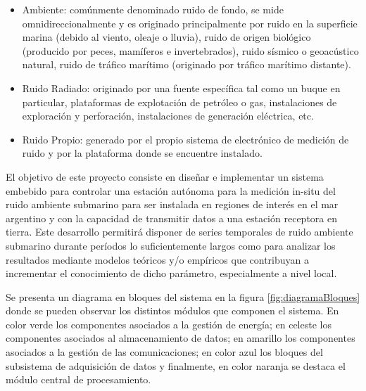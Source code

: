 \begin{itemize}
	\item Ambiente: comúnmente denominado ruido de fondo, se mide omnidireccionalmente y es originado principalmente por ruido en la superficie marina (debido al viento, oleaje o lluvia), ruido de origen biológico (producido por peces, mamíferos e invertebrados), ruido sísmico o geoacústico natural, ruido de tráfico marítimo (originado por tráfico marítimo distante).
	\item Ruido Radiado: originado por una fuente específica tal como un buque en particular, plataformas de explotación de petróleo o gas, instalaciones de exploración y perforación, instalaciones de generación eléctrica, etc.
	\item Ruido Propio: generado por el propio sistema de electrónico de medición de ruido y por la plataforma donde se encuentre instalado.
\end{itemize} 

El objetivo de este proyecto consiste en diseñar e implementar un sistema embebido para controlar una estación autónoma para la medición in-situ del ruido ambiente submarino para ser instalada en regiones de interés en el mar argentino y con la capacidad de transmitir datos a una estación receptora en tierra. Este desarrollo permitirá disponer de series temporales de ruido ambiente submarino durante períodos lo suficientemente largos como para analizar los resultados mediante modelos teóricos y/o empíricos que contribuyan a incrementar el conocimiento de dicho parámetro, especialmente a nivel local.

Se presenta un diagrama en bloques del sistema en la figura \ref{fig:diagramaBloques} donde se pueden observar los distintos módulos que componen el sistema.  En color verde los componentes asociados a la gestión de energía; en celeste los componentes asociados al almacenamiento de datos; en amarillo los componentes asociados a la gestión de las comunicaciones; en color azul los bloques del subsistema de adquisición de datos y finalmente, en color naranja se destaca el módulo central de procesamiento.

